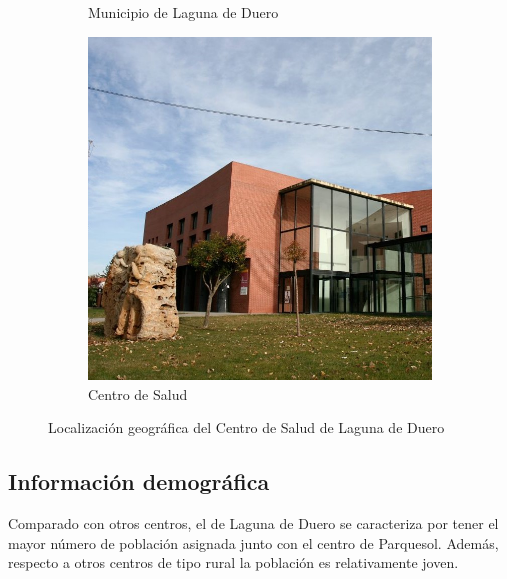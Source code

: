 \begin{figure}[H]
\begin{subfigure}[H]{0.48\textwidth}
        \caption{Municipio de Laguna de Duero}
    \end{subfigure}
    \hfill
    \begin{subfigure}[H]{0.48\textwidth}
        \centering
        \includegraphics*[width=\textwidth]{img/centro-salud.jpg}
        \caption{Centro de Salud}
    \end{subfigure}
    \caption{Localización geográfica del Centro de Salud de Laguna de Duero}
    \label{fig:localizacion-centro}
\end{figure}

\subsection{Información demográfica}

Comparado con otros centros, el de Laguna de Duero se caracteriza por tener el mayor número de población asignada junto con el centro de Parquesol. Además, respecto a otros centros de tipo rural la población es relativamente joven.

